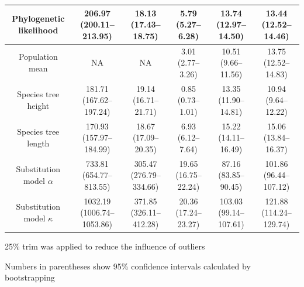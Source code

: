 \documentclass[12pt]{article}
\begin{document}
\begin{landscape}
\begin{table}[htb!]
\begin{threeparttable}
\begin{adjustbox}{center}
\begin{tabular}{|c|c|c|c|c|c|}
\hline
Phylogenetic likelihood & 206.97 (200.11--213.95) & 18.13 (17.43--18.75) & 5.79 (5.27--6.28) & 13.74 (12.97--14.50) & 13.44 (12.52--14.46)\tabularnewline
\hline
Population mean & NA & NA & 3.01 (2.77--3.26) & 10.51 (9.66--11.56) & 13.75 (12.52--14.83)\tabularnewline
\hline
Species tree height & 181.71 (167.62--197.24) & 19.14 (16.71--21.71) & 0.85 (0.73--1.01) & 13.35 (11.90--14.81) & 10.94 (9.64--12.22)\tabularnewline
\hline
Species tree length & 170.93 (157.97--184.99) & 18.67 (17.09--20.35) & 6.93 (6.12--7.64) & 15.22 (14.11--16.49) & 15.06 (13.84--16.37)\tabularnewline
\hline
Substitution model $\alpha$ & 733.81 (654.77--813.55) & 305.47 (276.79--334.66) & 19.65 (16.75--22.24) & 87.16 (83.85--90.45) & 101.86 (96.44--107.12)\tabularnewline
\hline
Substitution model $\kappa$ & 1032.19 (1006.74--1053.86) & 371.85 (326.11--412.28) & 20.36 (17.24--23.27) & 103.03 (99.14--107.61) & 121.88 (114.24--129.74)\tabularnewline
\hline
\end{tabular}
\end{adjustbox}
\begin{tablenotes}
\footnotesize
\item 25\% trim was applied to reduce the influence of outliers
\item Numbers in parentheses show 95\% confidence intervals calculated by bootstrapping
\end{tablenotes}
\end{threeparttable}
\end{table}

\end{landscape}
\end{document}
